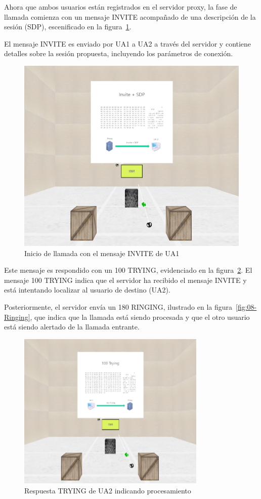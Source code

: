 \documentclass[a4paper, 12pt]{book}
\begin{document}
Ahora que ambos usuarios están registrados en el servidor proxy, la fase de llamada comienza con un mensaje INVITE acompañado de 
una descripción de la sesión (SDP), escenificado en la figura~\ref{fig:06-Invite}. 

El mensaje INVITE es enviado por UA1 a UA2 a través del servidor y contiene detalles sobre la sesión propuesta, 
incluyendo los parámetros de conexión.

\bigskip

\begin{figure}[H]
  \centering
  \includegraphics[width=12cm, keepaspectratio]{img/resultados/06-Invite.PNG}
  \caption{Inicio de llamada con el mensaje INVITE de UA1}
  \label{fig:06-Invite}
\end{figure}
\clearpage

Este mensaje es respondido con un 100 TRYING, evidenciado en la figura~\ref{fig:07-Trying}. 
El mensaje 100 TRYING indica que el servidor ha recibido el mensaje INVITE y está intentando localizar al usuario de destino (UA2).

Posteriormente, el servidor envía un 180 RINGING, ilustrado en la figura~\ref{fig:08-Ringing}, 
que indica que la llamada está siendo procesada y que el otro usuario está siendo alertado de la llamada entrante.

\begin{figure}[H]
  \centering
  \includegraphics[width=9cm, keepaspectratio]{img/resultados/07-Trying.PNG}
  \caption{Respuesta TRYING de UA2 indicando procesamiento}
  \label{fig:07-Trying}
\end{figure}
\end{document}
